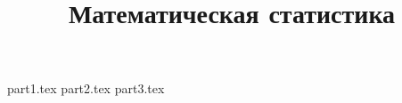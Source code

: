 

\title{Математическая статистика}

\makeindex


\maketitle

{part1.tex}
{part2.tex}
{part3.tex}


\printindex
\tableofcontents

